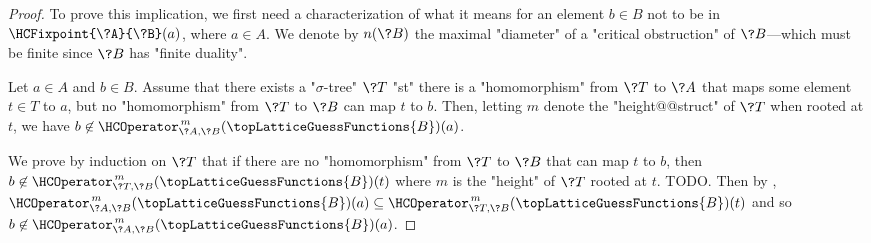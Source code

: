 \begin{proof}
	To prove this implication, we first need a characterization of
	what it means for an element $b\in B$ not to be in $\HCFixpoint{\?A}{\?B}(a)$,
	where $a\in A$.
	We denote by $n(\?B)$ the maximal "diameter" of a "critical obstruction" of $\?B$---which
	must be finite since $\?B$ has "finite duality".
	\begin{claim}
		\AP\label{claim:hyperedge-consistency-uniform-convergence-tree-witnesses}
		Let $a\in A$ and $b\in B$. Assume that there exists a "$\sigma$-tree" $\?T$ "st" there is a "homomorphism" from $\?T$ to $\?A$ that maps some element $t \in T$ to $a$, but no "homomorphism" from $\?T$ to $\?B$
		can map $t$ to $b$. Then, letting $m$ denote the "height@@struct" of $\?T$ when rooted
		at $t$, we have $b \not\in \HCOperator^{\,m}_{\?A,\?B}(\topLatticeGuessFunctions{B})(a)$.
	\end{claim}
	We prove by induction on $\?T$ that if there are no "homomorphism" from $\?T$ to $\?B$
	that can map $t$ to $b$, then $b \not\in \HCOperator^{\,m}_{\?T,\?B}(\topLatticeGuessFunctions{B})(t)$ where $m$ is the "height" of $\?T$ rooted at $t$.
	TODO.
	Then by , 
	$\HCOperator^{\,m}_{\?A,\?B}(\topLatticeGuessFunctions{B})(a) \subseteq
	\HCOperator^{\,m}_{\?T,\?B}(\topLatticeGuessFunctions{B})(t)$ and so
	$b \not\in \HCOperator^{\,m}_{\?A,\?B}(\topLatticeGuessFunctions{B})(a)$.


\end{proof}
